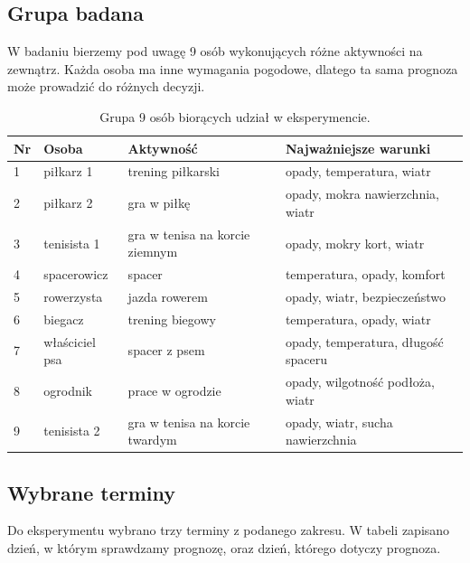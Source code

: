 \documentclass[a4paper,12pt]{article}
\begin{document}
\newpage
\subsection{Grupa badana}

W badaniu bierzemy pod uwagę 9 osób wykonujących różne aktywności na zewnątrz.
Każda osoba ma inne wymagania pogodowe, dlatego ta sama prognoza może prowadzić
do różnych decyzji.

\begin{table}[H]
\centering
\small
\begin{tabular}{p{0.8cm}p{3.0cm}p{4.0cm}p{5.3cm}}
\toprule
\textbf{Nr} & \textbf{Osoba} & \textbf{Aktywność} & \textbf{Najważniejsze warunki} \\
\midrule
1 & piłkarz 1 & trening piłkarski & opady, temperatura, wiatr \\[12pt]
2 & piłkarz 2 & gra w piłkę & opady, mokra nawierzchnia, wiatr \\[12pt]
3 & tenisista 1 & gra w tenisa na korcie ziemnym & opady, mokry kort, wiatr \\[12pt]
4 & spacerowicz & spacer & temperatura, opady, komfort \\[12pt]
5 & rowerzysta & jazda rowerem & opady, wiatr, bezpieczeństwo \\[12pt]
6 & biegacz & trening biegowy & temperatura, opady, wiatr \\[12pt]
7 & właściciel psa & spacer z psem & opady, temperatura, długość spaceru \\[12pt]
8 & ogrodnik & prace w ogrodzie & opady, wilgotność podłoża, wiatr \\[12pt]
9 & tenisista 2 & gra w tenisa na korcie twardym & opady, wiatr, sucha nawierzchnia \\
\bottomrule
\end{tabular}
\caption{Grupa 9 osób biorących udział w eksperymencie.}
\end{table}

\subsection{Wybrane terminy}

Do eksperymentu wybrano trzy terminy z podanego zakresu. W tabeli zapisano dzień,
w którym sprawdzamy prognozę, oraz dzień, którego dotyczy prognoza.
\end{document}
